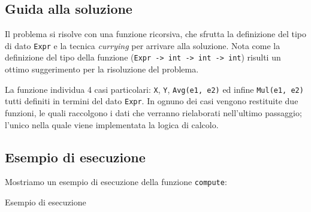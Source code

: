\subsection{Guida alla soluzione}

Il problema si risolve con una funzione ricorsiva, che sfrutta la definizione del tipo di dato \texttt{Expr} e la tecnica  \emph{currying} per arrivare alla soluzione.
Nota come la definizione del tipo della funzione (\texttt{Expr -> int -> int -> int}) risulti un ottimo suggerimento per la risoluzione del problema.

La funzione individua 4 casi particolari: \texttt{X}, \texttt{Y}, \texttt{Avg(e1, e2)} ed infine \texttt{Mul(e1, e2)} tutti definiti in termini del dato \texttt{Expr}.
In ognuno dei casi vengono restituite due funzioni, le quali raccolgono i dati che verranno rielaborati nell'ultimo passaggio;
l'unico nella quale viene implementata la logica di calcolo.

\subsection*{Esempio di esecuzione}

Mostriamo un esempio di esecuzione della funzione \texttt{compute}:

\begin{listing}[!h]
\caption[]{Esempio di esecuzione}
\end{listing}
